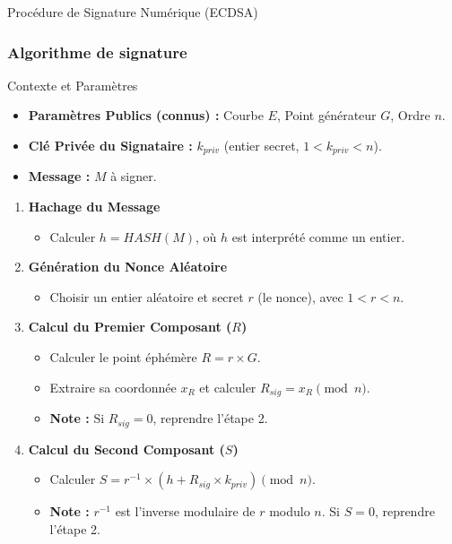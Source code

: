 \begin{frame}{Procédure de Signature Numérique (ECDSA)}
\frametitle{Algorithme de signature}

\begin{block}{Contexte et Paramètres}
    \begin{itemize}
        \item \textbf{Paramètres Publics (connus) :} Courbe $E$, Point générateur $G$, Ordre $n$.
        \item \textbf{Clé Privée du Signataire :} $k_{priv}$ (entier secret, $1 < k_{priv} < n$).
        \item \textbf{Message :} $M$ à signer.
    \end{itemize}
\end{block}

\vspace{0.2cm}

\begin{enumerate}
    \item \textbf{Hachage du Message}
    \begin{itemize}
        \item Calculer $h = HASH(M)$, où $h$ est interprété comme un entier.
    \end{itemize}
    
    \item \textbf{Génération du Nonce Aléatoire}
    \begin{itemize}
        \item Choisir un entier aléatoire et secret $r$ (le nonce), avec $1 < r < n$.
    \end{itemize}
    
    \item \textbf{Calcul du Premier Composant ($R$)}
    \begin{itemize}
        \item Calculer le point éphémère $R = r \times G$.
        \item Extraire sa coordonnée $x_R$ et calculer $R_{sig} = x_R \pmod n$.
        \item \textbf{Note :} Si $R_{sig} = 0$, reprendre l'étape 2.
    \end{itemize}
    
    \item \textbf{Calcul du Second Composant ($S$)}
    \begin{itemize}
        \item Calculer $S = r^{-1} \times (h + R_{sig} \times k_{priv}) \pmod n$.
        \item \textbf{Note :} $r^{-1}$ est l'inverse modulaire de $r$ modulo $n$. Si $S = 0$, reprendre l'étape 2.
    \end{itemize}
\end{enumerate}

\end{frame}

